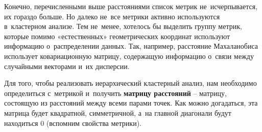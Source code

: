 \documentclass[12pt,a4paper]{article}
\theoremstyle{definition}
\begin{document}
Конечно, перечисленными выше расстояниями список метрик не~исчерпывается, их 
гораздо больше. Но далеко не~все метрики активно используются в~кластерном анализе. 
Тем не~менее, хотелось бы выделить группу метрик, которые помимо «естественных» 
геометрических координат используют информацию о~распределении данных. 
Так, например, расстояние Махаланобиса использует ковариационную матрицу, 
содержащую информацию о~связи между случайными векторами и~их дисперсии.

Для того, чтобы реализовать иерархический кластерный анализ, нам необходимо определиться 
с~метрикой и~получить \textbf{матрицу расстояний} – матрицу, состоящую из расстояний 
между всеми парами точек. Как можно догадаться, эта матрица будет квадратной, 
симметричной, а~на главной диагонали будут находиться $0$ (вспомним свойства метрики).
\end{document}
